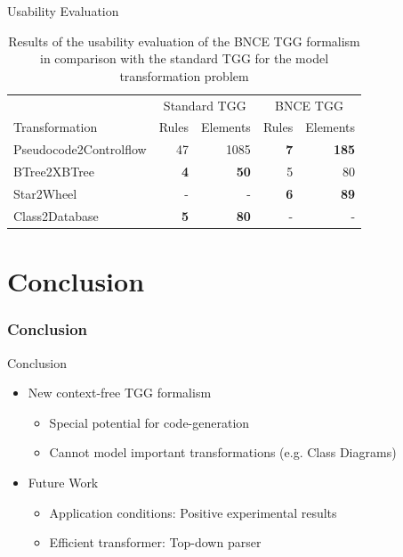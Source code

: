 \documentclass[usenames,dvipsnames]{beamer}
\begin{document}
	\begin{frame}{Usability Evaluation}
		\footnotesize 
		\begin{table}[h]
			\centering
			\begin{tabular}{l r r r r }
				\hline
				& \multicolumn{2}{c}{Standard TGG} & \multicolumn{2}{c}{BNCE TGG}\\
				Transformation 			& Rules & Elements 	& Rules & Elements\\
				\hline
				Pseudocode2Controlflow	& 47			& 1085	& \textbf{7}	& \textbf{185} \\
				BTree2XBTree			& \textbf{4}	& \textbf{50}	& 5		& 80 \\
				Star2Wheel				& -				& -		& \textbf{6}	& \textbf{89} \\
				Class2Database			& \textbf{5}	& \textbf{80}	& - 	& -  \\
				\hline
			\end{tabular}
			\caption{Results of the usability evaluation of the BNCE TGG formalism in comparison with the standard TGG for the model transformation problem}
		\end{table}
	\end{frame}
	
	\section{Conclusion}
	\begin{frame}
		\frametitle{Conclusion}
	\end{frame}
	
	\begin{frame}{Conclusion}
		\begin{itemize}
			\item New context-free TGG formalism
			\begin{itemize}
				\item Special potential for code-generation
				\item Cannot model important transformations (e.g. Class Diagrams)
			\end{itemize}
			\pause
			\item Future Work
			\begin{itemize}
				\item Application conditions: Positive experimental results
				\item Efficient transformer: Top-down parser
			\end{itemize}
		\end{itemize}
	\end{frame}
	
\end{document}
